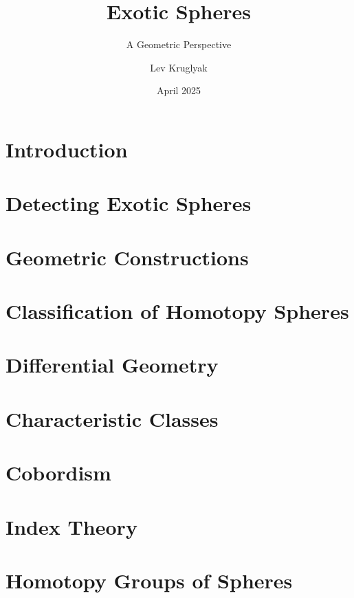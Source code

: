 \documentclass{lkx_thesis}
\title{Exotic Spheres}
\subtitle{A Geometric Perspective}
\author{Lev Kruglyak}
\date{April 2025}
\begin{document}


\lkxtoc



\chapter{Introduction}\label{chap:introduction}


\chapter{Detecting Exotic Spheres}\label{chap:detection}


\chapter{Geometric Constructions}\label{chap:construction}


\chapter{Classification of Homotopy Spheres}\label{chap:classification}


\begin{appendices}
\chapter{Differential Geometry}\label{chap:differential_geometry}


\chapter{Characteristic Classes}\label{chap:characteristic_classes}


\chapter{Cobordism}\label{chap:cobordism}


\chapter{Index Theory}\label{chap:index_theory}


\chapter{Homotopy Groups of Spheres}\label{chap:homotopy_groups_of_spheres}

\end{appendices}

\lkxrefs
\lkxindex
\end{document}
